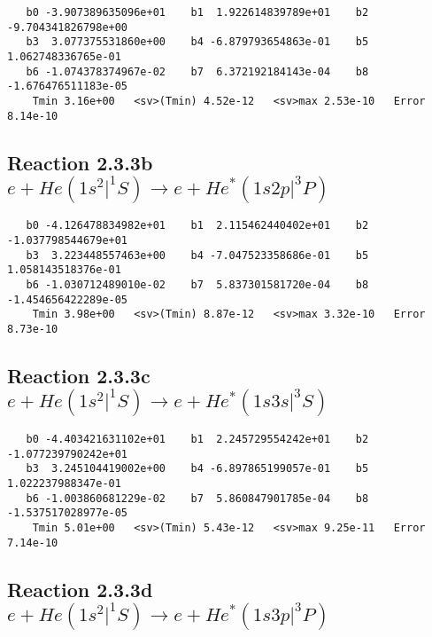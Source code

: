 \documentclass[12pt]{article}
\begin{document}
\begin{small}\begin{verbatim}
   b0 -3.907389635096e+01    b1  1.922614839789e+01    b2 -9.704341826798e+00
   b3  3.077375531860e+00    b4 -6.879793654863e-01    b5  1.062748336765e-01
   b6 -1.074378374967e-02    b7  6.372192184143e-04    b8 -1.676476511183e-05
    Tmin 3.16e+00   <sv>(Tmin) 4.52e-12   <sv>max 2.53e-10   Error 8.14e-10
\end{verbatim}\end{small}




                          


\newpage
\subsection{
Reaction 2.3.3b $  e + He(1s^2|^1S) \rightarrow e + He^*(1s2p|^3P)$}


\begin{small}\begin{verbatim}
   b0 -4.126478834982e+01    b1  2.115462440402e+01    b2 -1.037798544679e+01
   b3  3.223448557463e+00    b4 -7.047523358686e-01    b5  1.058143518376e-01
   b6 -1.030712489010e-02    b7  5.837301581720e-04    b8 -1.454656422289e-05
    Tmin 3.98e+00   <sv>(Tmin) 8.87e-12   <sv>max 3.32e-10   Error 8.73e-10
\end{verbatim}\end{small}

\newpage
\subsection{
Reaction 2.3.3c $  e + He(1s^2|^1S) \rightarrow e + He^*(1s3s|^3S)$}


\begin{small}\begin{verbatim}
   b0 -4.403421631102e+01    b1  2.245729554242e+01    b2 -1.077239790242e+01
   b3  3.245104419002e+00    b4 -6.897865199057e-01    b5  1.022237988347e-01
   b6 -1.003860681229e-02    b7  5.860847901785e-04    b8 -1.537517028977e-05
    Tmin 5.01e+00   <sv>(Tmin) 5.43e-12   <sv>max 9.25e-11   Error 7.14e-10
\end{verbatim}\end{small}

\newpage
\subsection{
Reaction 2.3.3d $  e + He(1s^2|^1S) \rightarrow e + He^*(1s3p|^3P)$}
\end{document}
